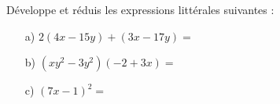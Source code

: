 \medskip
Développe et réduis les expressions littérales suivantes :
\begin{enumerate}
\item[a)] $2(4 x-15 y)+(3 x-17 y)=$
\item[b)] $\left(x y^2-3 y^2\right)(-2+3 x)=$
\item[c)] $(7 x-1)^2=$
\end{enumerate}